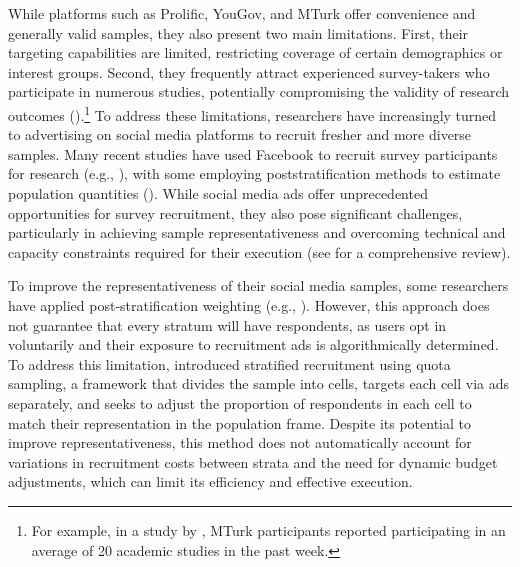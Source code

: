 While platforms such as Prolific, YouGov, and MTurk offer convenience and generally valid samples, they also present two main limitations. First, their targeting capabilities are limited, restricting coverage of certain demographics or interest groups. Second, they frequently attract experienced survey-takers who participate in numerous studies, potentially compromising the validity of research outcomes (\citealt{krefeld2024exposing}).\footnote{For example, in a study by \citet{rand2014social}, MTurk participants reported participating in an average of 20 academic studies in the past week.}  To address these limitations, researchers have increasingly turned to advertising on social media platforms to recruit fresher and more diverse samples. Many recent studies have used Facebook to recruit survey participants for research (e.g., \citealt{allcott2020welfare,donati2024can,sances2018ideology}), with some employing poststratification methods to estimate population quantities (\citealt{Zagheni2017,Perrotta2020}). 
While social media ads  offer unprecedented opportunities for survey recruitment, they also pose significant challenges, particularly in achieving sample representativeness and overcoming technical and capacity constraints required for their execution (see \citealt{aridor2024experiments} for a comprehensive review).








To improve the representativeness of their social media samples, some researchers have applied post-stratification weighting (e.g., \citealt{boas2020recruiting}). However, this approach does not guarantee that every stratum will have respondents, as users opt in voluntarily and their exposure to recruitment ads is algorithmically determined. To address this limitation, \citet{zhang2020quota} introduced stratified recruitment using quota sampling, a framework that divides the sample into cells, targets each cell via ads separately, and seeks to adjust the proportion of respondents in each cell to match their representation in the population frame. Despite its potential to improve representativeness, this method does not automatically account for variations in recruitment costs between strata and the need for dynamic budget adjustments, which can limit its efficiency and effective execution.

